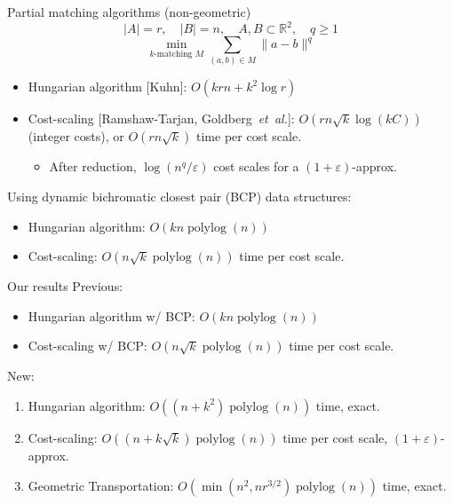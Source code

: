 \documentclass[xcolor={dvipsnames,usenames}]{beamer}
\newcommand{\etal}{\textit{et~al.}}
\newcommand{\reals}{\mathbb{R}}
\newcommand{\eps}{\varepsilon}
\DeclareMathOperator{\polylog}{polylog}
\begin{document}
\begin{frame}{Partial matching algorithms (non-geometric)}
\begin{equation*}
|A| = r, \quad |B| = n, \quad A, B \subset \reals^2, \quad q \geq 1 
\end{equation*}
\begin{equation*}
\min_{k \text{-matching } M}\sum_{(a, b) \in M} \|a - b\|^q
\end{equation*}
\begin{itemize}
\item Hungarian algorithm [Kuhn]: $O(krn + k^2\log r)$
\item Cost-scaling [Ramshaw-Tarjan, Goldberg~\etal]: $O(rn\sqrt{k}\log(kC))$ (integer costs),
	or $O(rn\sqrt{k})$ time per cost scale. \pause
	\begin{itemize}
	\item After reduction, $\log(n^q/\eps)$ cost scales for a $(1+\eps)$-approx. \pause
	\end{itemize}
\end{itemize}
\vspace{10pt}
Using dynamic bichromatic closest pair (BCP) data structures:
\begin{itemize}
\item Hungarian algorithm: $O(kn\polylog(n))$
\item Cost-scaling: $O(n\sqrt{k}\polylog(n))$ time per cost scale.
\end{itemize}
\end{frame}

\begin{frame}{Our results}
Previous:
\begin{itemize}
\item Hungarian algorithm w/ BCP: $O(kn\polylog(n))$
\item Cost-scaling w/ BCP: $O(n\sqrt{k}\polylog(n))$ time per cost scale.
\end{itemize}
\pause
\vspace{10pt}

New:
\begin{enumerate}
\item Hungarian algorithm: $O((n+k^2)\polylog(n))$ time, exact.
\item Cost-scaling: $O((n+k\sqrt{k})\polylog(n))$ time per cost scale, $(1+\eps)$-approx.
\pause
\vspace{10pt}
\item Geometric Transportation: $O(\min(n^2, nr^{3/2})\polylog(n))$ time, exact.
\end{enumerate}
\end{frame}
\end{document}
